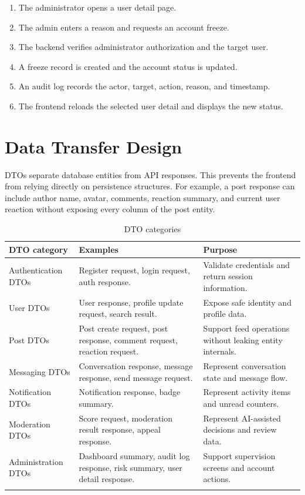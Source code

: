 \begin{enumerate}
    \item The administrator opens a user detail page.
    \item The admin enters a reason and requests an account freeze.
    \item The backend verifies administrator authorization and the target user.
    \item A freeze record is created and the account status is updated.
    \item An audit log records the actor, target, action, reason, and timestamp.
    \item The frontend reloads the selected user detail and displays the new status.
\end{enumerate}

\section{Data Transfer Design}

DTOs separate database entities from API responses. This prevents the frontend from relying directly on persistence structures. For example, a post response can include author name, avatar, comments, reaction summary, and current user reaction without exposing every column of the post entity.

\begin{longtable}{|m{3.5cm}|m{4.7cm}|m{5.5cm}|}
\hline
\textbf{DTO category} & \textbf{Examples} & \textbf{Purpose} \\
\hline
Authentication DTOs & Register request, login request, auth response. & Validate credentials and return session information. \\
\hline
User DTOs & User response, profile update request, search result. & Expose safe identity and profile data. \\
\hline
Post DTOs & Post create request, post response, comment request, reaction request. & Support feed operations without leaking entity internals. \\
\hline
Messaging DTOs & Conversation response, message response, send message request. & Represent conversation state and message flow. \\
\hline
Notification DTOs & Notification response, badge summary. & Represent activity items and unread counters. \\
\hline
Moderation DTOs & Score request, moderation result response, appeal response. & Represent AI-assisted decisions and review data. \\
\hline
Administration DTOs & Dashboard summary, audit log response, risk summary, user detail response. & Support supervision screens and account actions. \\
\hline
\caption{DTO categories}
\end{longtable}

